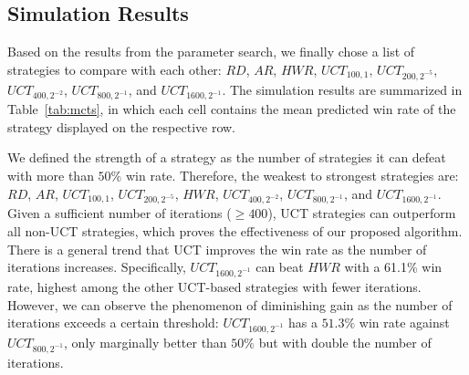\begin{table}
  \caption{Mean predicted win rate of row strategy  vs. column strategy. Simulations are based on the drafting rules of match mode ``Captain Mode''. The table can be viewed in a similar way as Table~\ref{tab:mcts}.}
  \label{tab:mcts_captain_mode}
  \centering
\end{table}


\subsection{Simulation Results}
Based on the results from the parameter search, we finally chose a list of strategies to compare with each other: $RD$, $AR$, $HWR$, $UCT_{100, 1}$, $UCT_{200, 2^{-5}}$, $UCT_{400, 2^{-2}}$, $UCT_{800, 2^{-1}}$, and $UCT_{1600, 2^{-1}}$. The simulation results are summarized in Table~\ref{tab:mcts}, in which each cell contains the mean predicted win rate of the strategy displayed on the respective row. 

We defined the strength of a strategy as the number of strategies it can defeat with more than $50\%$ win rate. Therefore, the weakest to strongest strategies are: $RD$, $AR$, $UCT_{100, 1}$, $UCT_{200, 2^{-5}}$, $HWR$, $UCT_{400, 2^{-2}}$, $UCT_{800, 2^{-1}}$, and $UCT_{1600, 2^{-1}}$. Given a sufficient number of iterations ($\geq400$), UCT strategies can outperform all non-UCT strategies, which proves the effectiveness of our proposed algorithm. There is a general trend that UCT improves the win rate as the number of iterations increases. Specifically, $UCT_{1600, 2^{-1}}$ can beat $HWR$ with a 61.1\% win rate, highest among the other UCT-based strategies with fewer iterations. However, we can observe the phenomenon of diminishing gain as the number of iterations exceeds a certain threshold: $UCT_{1600, 2^{-1}}$ has a $51.3\%$ win rate against $UCT_{800, 2^{-1}}$, only marginally better than $50\%$ but with double the number of iterations.

